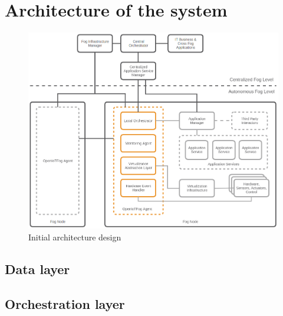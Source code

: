 
\section{Architecture of the system}
\doit

\begin{figure}[H]
    \centering
    \includegraphics[width=\textwidth]{resources/images/initial_structure.png}
    \caption[Initial architecture design]{Initial architecture design}
    \label{fig:initial_architecture_design}
\end{figure}



\subsection{Data layer}
\doit

\subsection{Orchestration layer}
\doit

